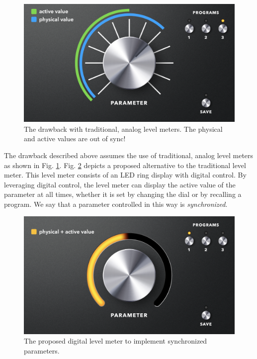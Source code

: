 \documentclass[conference]{IEEEtran}
\begin{document}
\begin{figure}[h]
    \centering
    \includegraphics[scale=0.27]{./resources/figures/param_analog.png}
    \caption{The drawback with traditional, analog level meters. The physical and active values are out of sync!}
    \label{fig:param_analog}
\end{figure}

The drawback described above assumes the use of traditional, analog level meters as shown in Fig. \ref{fig:param_analog}. Fig. \ref{fig:param_digital} depicts a proposed alternative to the traditional level meter. This level meter consists of an LED ring display with digital control. By leveraging digital control, the level meter can display the active value of the parameter at all times, whether it is set by changing the dial or by recalling a program. We say that a parameter controlled in this way is \textit{synchronized}.

\begin{figure}[h]
    \centering
    \includegraphics[scale=0.27]{./resources/figures/param_digital.png}
    \caption{The proposed digital level meter to implement synchronized parameters.}
    \label{fig:param_digital}
\end{figure}
\end{document}
